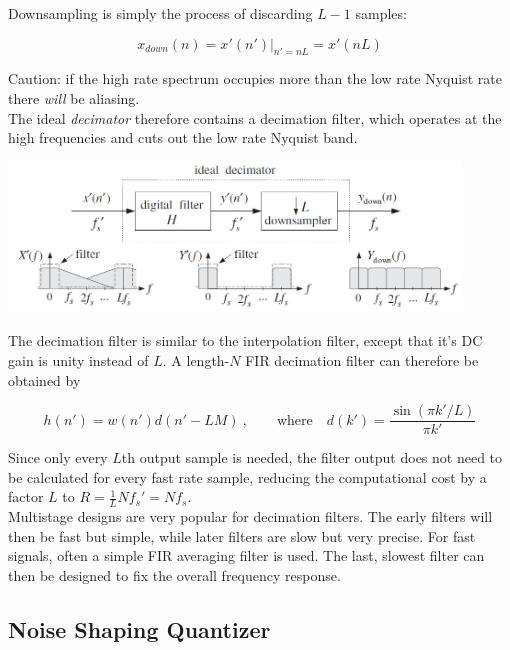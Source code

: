 Downsampling is simply the process of discarding $L-1$ samples:

\begin{equation*}
	x_{down}(n) = \left.x'(n')\right|_{n'=nL} = x'(nL)
\end{equation*}

Caution: if the high rate spectrum occupies more than the low rate Nyquist rate
there \emph{will} be aliasing. \\

The ideal \emph{decimator} therefore contains a decimation filter, which 
operates at the high frequencies and cuts out the low rate Nyquist band.

\begin{center}
	\includegraphics[width=12cm]{images/IntDecOv_Decimator.jpg}
\end{center}

The decimation filter is similar to the interpolation filter, except that
it's DC gain is unity instead of $L$. A length-$N$ FIR decimation filter
can therefore be obtained by

\begin{equation*}
	h(n') = w(n') d(n'-LM) \:,\qquad \text{where} \quad 
	d(k') = \frac{\sin(\pi k'/L)}{\pi k'}
\end{equation*}

Since only every $L$th output sample is needed, the filter output does
not need to be calculated for every fast rate sample, reducing the computational
cost by a factor $L$ to $R = \frac{1}{L} N f_s' = N f_s$. \\


Multistage designs are very popular for decimation filters. The early filters will
then be fast but simple, while later filters are slow but very precise. For fast
signals, often a simple FIR averaging filter is used. The last, slowest filter
can then be designed to fix the overall frequency response.


\subsection{Noise Shaping Quantizer}

